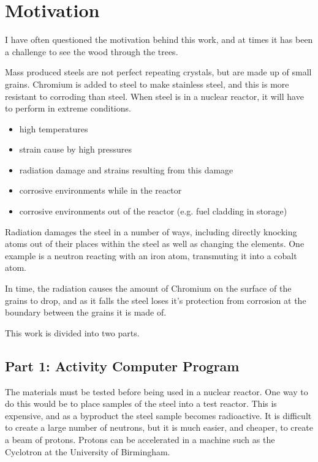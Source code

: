 \section{Motivation}

I have often questioned the motivation behind this work, and at times it has been a challenge to see the wood through the trees.

Mass produced steels are not perfect repeating crystals, but are made up of small grains.  Chromium is added to steel to make stainless steel, and this is more resistant to corroding than steel.  When steel is in a nuclear reactor, it will have to perform in extreme conditions.

\begin{itemize}
\item high temperatures
\item strain cause by high pressures 
\item radiation damage and strains resulting from this damage
\item corrosive environments while in the reactor
\item corrosive environments out of the reactor (e.g. fuel cladding in storage)
\end{itemize}

Radiation damages the steel in a number of ways, including directly knocking atoms out of their places within the steel as well as changing the elements.  One example is a neutron reacting with an iron atom, transmuting it into a cobalt atom.

In time, the radiation causes the amount of Chromium on the surface of the grains to drop, and as it falls the steel loses it's protection from corrosion at the boundary between the grains it is made of.  

This work is divided into two parts.

\subsection{Part 1: Activity Computer Program}

The materials must be tested before being used in a nuclear reactor.  One way to do this would be to place samples of the steel into a test reactor.  This is expensive, and as a byproduct the steel sample becomes radioactive.  It is difficult to create a large number of neutrons, but it is much easier, and cheaper, to create a beam of protons.  Protons can be accelerated in a machine such as the Cyclotron at the University of Birmingham.  

